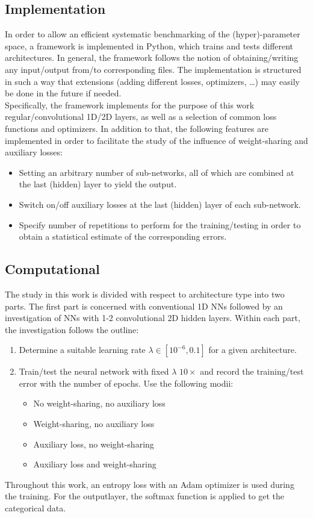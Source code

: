 \documentclass[a4paper, 12pt, conference]{article}
\begin{document}
\subsection{Implementation}
In order to allow an efficient systematic benchmarking of the (hyper)-parameter space, a framework is implemented in Python, which trains and tests different architectures. In general, the framework follows the notion of obtaining/writing any input/output from/to corresponding files. The implementation is structured in such a way that extensions (adding different losses, optimizers, \ldots) may easily be done in the future if needed.\\
Specifically, the framework implements for the purpose of this work regular/convolutional 1D/2D layers, as well as a selection of common loss functions and optimizers. In addition to that, the following features are implemented in order to facilitate the study of the influence of weight-sharing and auxiliary losses: 
\begin{itemize}
    \item Setting an arbitrary number of sub-networks, all of which are combined at the last (hidden) layer to yield the output.
    \item Switch on/off auxiliary losses at the last (hidden) layer of each sub-network.
    \item Specify number of repetitions to perform for the training/testing in order to obtain a statistical estimate of the corresponding errors.
\end{itemize}

\subsection{Computational}
The study in this work is divided with respect to architecture type into two parts. The first part is concerned with conventional 1D NNs followed by an investigation of NNs with 1-2 convolutional 2D hidden layers. Within each part, the investigation follows the outline:
\begin{enumerate}
    \item Determine a suitable learning rate $\lambda\in[10^{-6},0.1]$ for a given architecture.
    \item Train/test the neural network with fixed $\lambda$ $10\times$ and record the training/test error with the number of epochs. Use the following modii:
    \begin{itemize}
        \item No weight-sharing, no auxiliary loss
        \item Weight-sharing, no auxiliary loss
        \item Auxiliary loss, no weight-sharing
        \item Auxiliary loss and weight-sharing
    \end{itemize}
\end{enumerate}
Throughout this work, an entropy loss with an Adam optimizer is used during the training. For the outputlayer, the softmax function is applied to get the categorical data.  
\end{document}
